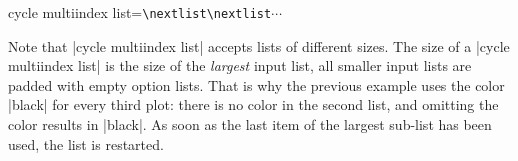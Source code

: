\begin{pgfplotskey}{cycle multiindex list=\texttt{\textbackslash nextlist}\texttt{\textbackslash nextlist}$\dotsb$}
\begin{codeexample}[]
\end{codeexample}

	Note that |cycle multiindex list| accepts lists of different sizes. The size of a |cycle multiindex list| is the size of the \emph{largest} input list, all smaller input lists are padded with empty option lists. That is why the previous example uses the color |black| for every third plot: there is no color in the second list, and omitting the color results in |black|. As soon as the last item of the largest sub-list has been used, the list is restarted.
\end{pgfplotskey}

